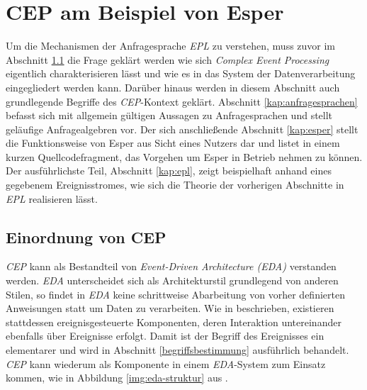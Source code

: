 \documentclass{acm_proc_article-sp}
\begin{document}
%
%

\section{CEP am Beispiel von Esper}
\vspace{0.1cm}

Um die Mechanismen der Anfragesprache \textit{EPL} zu verstehen, muss zuvor im Abschnitt 
\ref{kap:einordnung} die Frage 
geklärt werden wie sich \textit{Complex Event Processing} eigentlich charakterisieren 
lässt und wie es in das System der Datenverarbeitung eingegliedert werden kann. Darüber 
hinaus werden in diesem Abschnitt auch grundlegende Begriffe des \textit{CEP}-Kontext 
geklärt. Abschnitt \ref{kap:anfragesprachen} befasst sich mit allgemein gültigen Aussagen 
zu Anfragesprachen und stellt geläufige Anfragealgebren vor. Der sich anschließende 
Abschnitt \ref{kap:esper} stellt die Funktionsweise von Esper aus Sicht eines Nutzers dar 
und listet in einem kurzen Quellcodefragment, das Vorgehen um Esper in Betrieb nehmen zu 
können. Der ausführlichste Teil, Abschnitt \ref{kap:epl}, zeigt beispielhaft anhand eines 
gegebenem Ereignisstromes, wie sich die Theorie der vorherigen Abschnitte in 
\textit{EPL} realisieren lässt.


\subsection{Einordnung von CEP}\label{kap:einordnung}
\vspace{0.1cm}
\textit{CEP} kann als Bestandteil von \textit{Event-Driven Architecture (EDA)} verstanden 
werden. \textit{EDA} unterscheidet sich als Architekturstil 
grundlegend von anderen Stilen, so findet in \textit{EDA} keine schrittweise Abarbeitung 
von vorher definierten Anweisungen statt um Daten zu verarbeiten. Wie in \cite{glossary} 
beschrieben, existieren stattdessen ereignisgesteuerte Komponenten, deren Interaktion 
untereinander ebenfalls über Ereignisse erfolgt. Damit ist der Begriff des Ereignisses 
ein elementarer und wird in Abschnitt \ref{begriffsbestimmung} ausführlich behandelt. 
\textit{CEP} kann wiederum als Komponente in einem \textit{EDA}-System zum Einsatz 
kommen, wie in Abbildung \ref{img:eda-struktur} aus \cite{bruns}.
\end{document}

